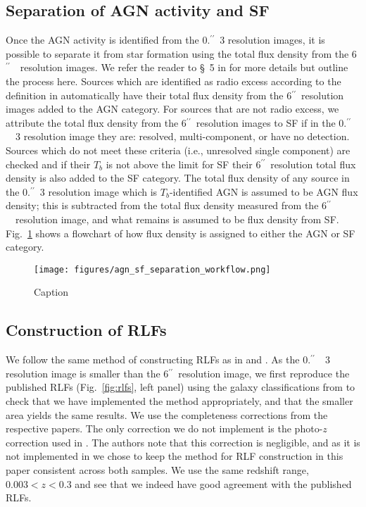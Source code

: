 \documentclass[usenatbib,fleqn,letters]{mnras}
\newcommand{\sarc}{$^{\prime\prime}\!\!$}
\begin{document}
\subsection{Separation of AGN activity and SF}
Once the AGN activity is identified from the 0.\sarc\ 3 resolution images, it is possible to separate it from star formation using the total flux density from the 6\sarc\ \ resolution images. We refer the reader to \S~5 in  for more details but outline the process here. Sources which are identified as radio excess according to the definition in  automatically have their total flux density from the 6\sarc\ resolution images added to the AGN category. For sources that are not radio excess, we attribute the total flux density from the 6\sarc\ resolution images to SF if in the 0.\sarc\ \ 3 resolution image they are: resolved, multi-component, or have no detection. Sources which do not meet these criteria (i.e., unresolved single component) are checked and if their $T_b$ is not above the limit for SF their 6\sarc\ resolution total flux density is also added to the SF category. The total flux density of any source in the 0.\sarc\ 3 resolution image which is $T_b$-identified AGN is assumed to be AGN flux density; this is subtracted from the total flux density measured from the 6\sarc\ \ resolution image, and what remains is assumed to be flux density from SF. Fig.~\ref{fig:flowchart} shows a flowchart of how flux density is assigned to either the AGN or SF category. 

\begin{figure}
    \centering
    \texttt{[image: figures/agn\_sf\_separation\_workflow.png]}
    \caption{Caption}
    \label{fig:flowchart}
\end{figure}

\subsection{Construction of RLFs}

We follow the same method of constructing RLFs as in \cite{kondapally_cosmic_2022} and \cite{cochrane_lofar_2023}. As the 0.\sarc\ \ 3 resolution image is smaller than the 6\sarc\ resolution image, we first reproduce the published RLFs (Fig.~\ref{fig:rlfs}, left panel) using the galaxy classifications from  to check that we have implemented the method appropriately, and that the smaller area yields the same results. We use the completeness corrections from the respective papers. The only correction we do not implement is the photo-$z$ correction used in \cite{cochrane_lofar_2023}. The authors note that this correction is negligible, and as it is not implemented in \cite{kondapally_cosmic_2022} we chose to keep the method for RLF construction in this paper consistent across both samples. We use the same redshift range, $0.003 < z < 0.3$ and see that we indeed have good agreement with the published RLFs.
\end{document}
